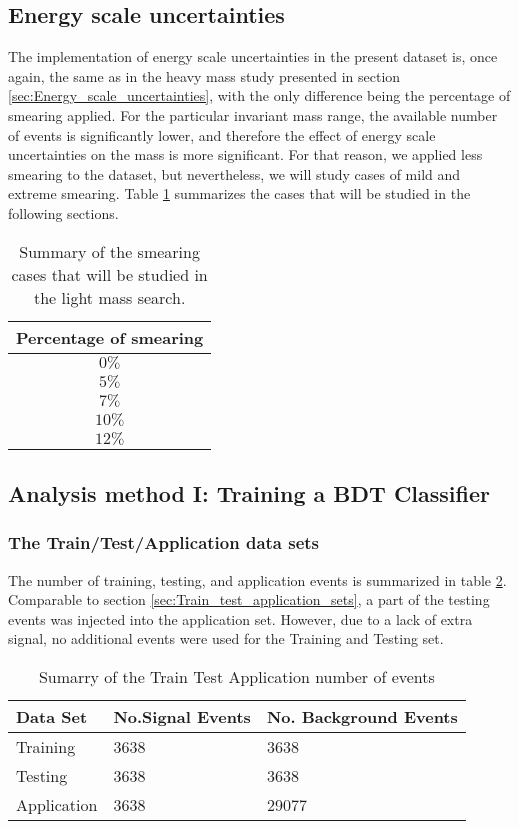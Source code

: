 \subsection{Energy scale uncertainties}
\label{sec:org56959c3}
\label{sec:Light_energy_scale_uncertainties}
The implementation of energy scale uncertainties in the present dataset is, once again, the same as in the heavy mass study presented in section \ref{sec:Energy_scale_uncertainties}, with the only difference being the percentage of smearing applied. For the particular invariant mass range, the available number of events is significantly lower, and therefore the effect of energy scale uncertainties on the mass is more significant. For that reason, we applied less smearing to the dataset, but nevertheless, we will study cases of mild and extreme smearing. Table \ref{table:LightSmearings} summarizes the cases that will be studied in the following sections.
\begin{table}[h!]
\centering
\begin{tabular}{ |c|  }
 \hline
Percentage of smearing \\
 \hline
$0\%$\\
$5\%$\\
$7\%$\\
$10\%$\\
$12\%$\\
\hline
\end{tabular}
\caption{Summary of the smearing cases that will be studied in the light mass search. }
\label{table:LightSmearings}
\end{table}
\subsection{Analysis method I: Training a BDT Classifier}
\label{sec:org6370180}
\subsubsection{The Train/Test/Application data sets}
\label{sec:orgceb51c1}
\label{sec:Light_train_test_application}
The number of training, testing, and application events is summarized in table \ref{table:LightTrainTestAppEvents}. Comparable to  section \ref{sec:Train_test_application_sets}, a part of the testing events was injected into the application set. However, due to a lack of extra signal, no additional events were used for the Training and Testing set.
\begin{table}[h!]
\centering
\begin{tabular}{ |p{3cm}|p{3cm}|p{4cm}|  }
 \hline
Data Set & No.Signal Events & No. Background Events \\
 \hline
Training & 3638 & 3638 \\
Testing & 3638 & 3638 \\
Application & 3638 & 29077 \\
 \hline
\end{tabular}
\caption{Sumarry of the Train Test Application number of events}
\label{table:LightTrainTestAppEvents}
\end{table}

